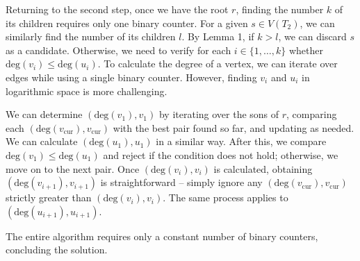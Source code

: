 \documentclass[12pt]{article}
\begin{document}
	\medskip
	
	Returning to the second step, once we have the root \(r\), finding the
	number \(k\) of its children requires only one binary counter. For a given
	\(s \in V(T_{2})\), we can similarly find the number of its children \(l\).
	By Lemma 1, if \(k > l\), we can discard \(s\) as a candidate. Otherwise, we
	need to verify for each \(i \in \{1, \ldots, k\}\) whether
	\(\text{deg}(v_{i}) \leqslant \text{deg}(u_{i})\). To calculate the degree
	of a vertex, we can iterate over edges while using a single binary counter.
	However, finding \(v_{i}\) and \(u_{i}\) in logarithmic space is more
	challenging.
	
	\medskip
	
	We can determine \((\text{deg}(v_{1}), v_{1})\) by iterating over the sons
	of \(r\), comparing each \((\text{deg}(v_{\text{cur}}), v_{\text{cur}})\)
	with the best pair found so far, and updating as needed. We can calculate
	\((\text{deg}(u_{1}), u_{1})\) in a similar way. After this, we compare
	\(\text{deg}(v_{1}) \leqslant \text{deg}(u_{1})\) and reject if the
	condition does not hold; otherwise, we move on to the next pair. Once
	\((\text{deg}(v_{i}), v_{i})\) is calculated, obtaining
	\((\text{deg}(v_{i + 1}), v_{i + 1})\) is straightforward -- simply ignore
	any \((\text{deg}(v_{\text{cur}}), v_{\text{cur}})\) strictly greater than
	\((\text{deg}(v_{i}), v_{i})\). The same process applies to
	\((\text{deg}(u_{i + 1}), u_{i + 1})\).
	
	\medskip
	
	The entire algorithm requires only a constant number of binary counters,
	concluding the solution.
\end{document}
